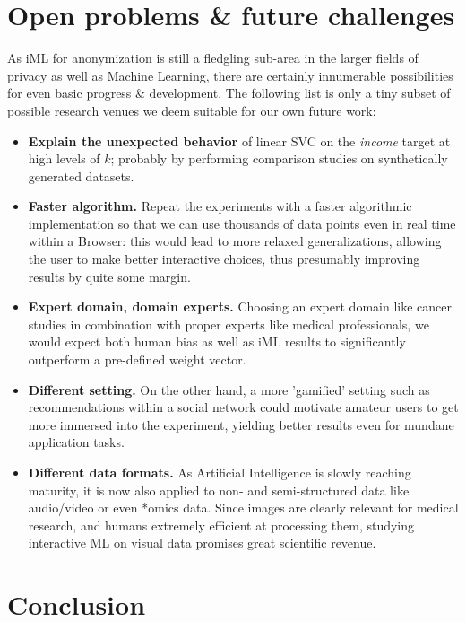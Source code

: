 \documentclass{llncs}
\begin{document}
\section{Open problems \& future challenges}
\label{sect:op_fc}

As iML for anonymization is still a fledgling sub-area in the larger fields of privacy as well as Machine Learning, there are certainly innumerable possibilities for even basic progress \& development. The following list is only a tiny subset of possible research venues we deem suitable for our own future work:

\begin{itemize}
	\item \textbf{Explain the unexpected behavior} of linear SVC on the \textit{income} target at high levels of $k$; probably by performing comparison studies on synthetically generated datasets.
	\item \textbf{Faster algorithm.} Repeat the experiments with a faster algorithmic implementation so that we can use thousands of data points even in real time within a Browser: this would lead to more relaxed generalizations, allowing the user to make better interactive choices, thus presumably improving results by quite some margin.
	\item \textbf{Expert domain, domain experts.} Choosing an expert domain like cancer studies in combination with proper experts like medical professionals, we would expect both human bias as well as iML results to significantly outperform a pre-defined weight vector.
	\item \textbf{Different setting.} On the other hand, a more 'gamified' setting such as recommendations within a social network could motivate amateur users to get more immersed into the experiment, yielding better results even for mundane application tasks.
	\item \textbf{Different data formats.} As Artificial Intelligence is slowly reaching maturity, it is now also applied to non- and semi-structured data like audio/video or even *omics data. Since images are clearly relevant for medical research, and humans extremely efficient at processing them, studying interactive ML on visual data promises great scientific revenue. 
\end{itemize}


\section{Conclusion}
\label{sect:conclusion}
\end{document}
